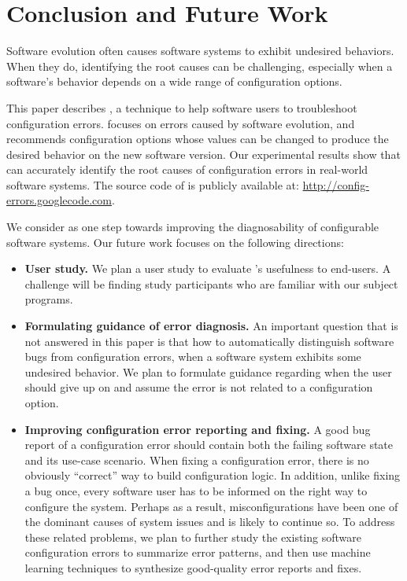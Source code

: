 \section{Conclusion and Future Work}
\label{sec:conclusion}

Software evolution often causes software systems to
exhibit undesired behaviors.
When they do, identifying the root causes
can be challenging, especially when a software's
behavior depends on a wide range of configuration options.

This paper describes \ourtool, a technique to help software
users to troubleshoot configuration errors. \ourtool
focuses on errors caused by software evolution, and
recommends configuration options whose values can be changed to
produce the desired behavior on the new software version.
Our experimental results show that \ourtool
can accurately identify the root causes of
\errornum configuration errors in \subjnum real-world software systems.
The source code of \ourtool is publicly available
at: \url{http://config-errors.googlecode.com}.

We consider \ourtool as one step towards improving
the diagnosability of configurable software systems.
Our future work focuses on the following directions:

\vspace{-2mm}

\begin{itemize}
\item \textbf{User study.} We plan a user study to evaluate
\ourtool's usefulness to end-users. A challenge
will be finding study participants who are familiar
with our subject programs.

\item \textbf{Formulating guidance of error diagnosis.}
An important question that is not answered in this paper
is that how to automatically distinguish software bugs from 
configuration errors, when a software system exhibits
some undesired behavior. We plan to formulate guidance
regarding when the user should give up on \ourtool
and assume the error is not related to a configuration option.

\item \textbf{Improving configuration error reporting and fixing.}
A good bug report of a configuration error should contain both the
failing software state and its use-case scenario.
When fixing a configuration error, there is no obviously ``correct'' way to
build configuration logic. In addition, unlike fixing a bug once,
every software user has to be informed on the right way to
configure the system. Perhaps as a result, misconfigurations
have been one of the dominant causes of system issues and
is likely to continue so. To address these related problems,
we plan to further study the existing software configuration errors
to summarize error patterns, and then use machine learning
techniques to synthesize good-quality error reports and fixes.

\end{itemize}
